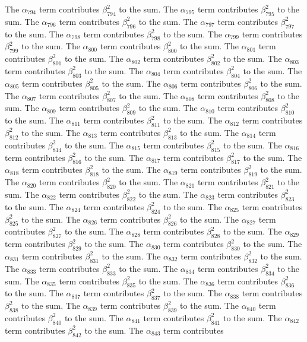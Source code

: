 \begin{lemma}
The $\alpha_{794}$ term contributes $\beta_{794}^{2}$ to the sum. The $\alpha_{795}$ term contributes $\beta_{795}^{2}$ to the sum. The $\alpha_{796}$ term contributes $\beta_{796}^{2}$ to the sum. The $\alpha_{797}$ term contributes $\beta_{797}^{2}$ to the sum. The $\alpha_{798}$ term contributes $\beta_{798}^{2}$ to the sum. The $\alpha_{799}$ term contributes $\beta_{799}^{2}$ to the sum. The $\alpha_{800}$ term contributes $\beta_{800}^{2}$ to the sum. The $\alpha_{801}$ term contributes $\beta_{801}^{2}$ to the sum. The $\alpha_{802}$ term contributes $\beta_{802}^{2}$ to the sum. The $\alpha_{803}$ term contributes $\beta_{803}^{2}$ to the sum. The $\alpha_{804}$ term contributes $\beta_{804}^{2}$ to the sum. The $\alpha_{805}$ term contributes $\beta_{805}^{2}$ to the sum. The $\alpha_{806}$ term contributes $\beta_{806}^{2}$ to the sum. The $\alpha_{807}$ term contributes $\beta_{807}^{2}$ to the sum. The $\alpha_{808}$ term contributes $\beta_{808}^{2}$ to the sum. The $\alpha_{809}$ term contributes $\beta_{809}^{2}$ to the sum. The $\alpha_{810}$ term contributes $\beta_{810}^{2}$ to the sum. The $\alpha_{811}$ term contributes $\beta_{811}^{2}$ to the sum. The $\alpha_{812}$ term contributes $\beta_{812}^{2}$ to the sum. The $\alpha_{813}$ term contributes $\beta_{813}^{2}$ to the sum. The $\alpha_{814}$ term contributes $\beta_{814}^{2}$ to the sum. The $\alpha_{815}$ term contributes $\beta_{815}^{2}$ to the sum. The $\alpha_{816}$ term contributes $\beta_{816}^{2}$ to the sum. The $\alpha_{817}$ term contributes $\beta_{817}^{2}$ to the sum. The $\alpha_{818}$ term contributes $\beta_{818}^{2}$ to the sum. The $\alpha_{819}$ term contributes $\beta_{819}^{2}$ to the sum. The $\alpha_{820}$ term contributes $\beta_{820}^{2}$ to the sum. The $\alpha_{821}$ term contributes $\beta_{821}^{2}$ to the sum. The $\alpha_{822}$ term contributes $\beta_{822}^{2}$ to the sum. The $\alpha_{823}$ term contributes $\beta_{823}^{2}$ to the sum. The $\alpha_{824}$ term contributes $\beta_{824}^{2}$ to the sum. The $\alpha_{825}$ term contributes $\beta_{825}^{2}$ to the sum. The $\alpha_{826}$ term contributes $\beta_{826}^{2}$ to the sum. The $\alpha_{827}$ term contributes $\beta_{827}^{2}$ to the sum. The $\alpha_{828}$ term contributes $\beta_{828}^{2}$ to the sum. The $\alpha_{829}$ term contributes $\beta_{829}^{2}$ to the sum. The $\alpha_{830}$ term contributes $\beta_{830}^{2}$ to the sum. The $\alpha_{831}$ term contributes $\beta_{831}^{2}$ to the sum. The $\alpha_{832}$ term contributes $\beta_{832}^{2}$ to the sum. The $\alpha_{833}$ term contributes $\beta_{833}^{2}$ to the sum. The $\alpha_{834}$ term contributes $\beta_{834}^{2}$ to the sum. The $\alpha_{835}$ term contributes $\beta_{835}^{2}$ to the sum. The $\alpha_{836}$ term contributes $\beta_{836}^{2}$ to the sum. The $\alpha_{837}$ term contributes $\beta_{837}^{2}$ to the sum. The $\alpha_{838}$ term contributes $\beta_{838}^{2}$ to the sum. The $\alpha_{839}$ term contributes $\beta_{839}^{2}$ to the sum. The $\alpha_{840}$ term contributes $\beta_{840}^{2}$ to the sum. The $\alpha_{841}$ term contributes $\beta_{841}^{2}$ to the sum. The $\alpha_{842}$ term contributes $\beta_{842}^{2}$ to the sum. The $\alpha_{843}$ term contributes 
\end{lemma}
